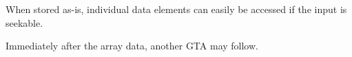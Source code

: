 \documentclass[a4paper,11pt]{article}
\begin{document}
When stored as-is, individual data elements can easily be accessed if the input
is seekable.

Immediately after the array data, another GTA may follow.



%
\end{document}

